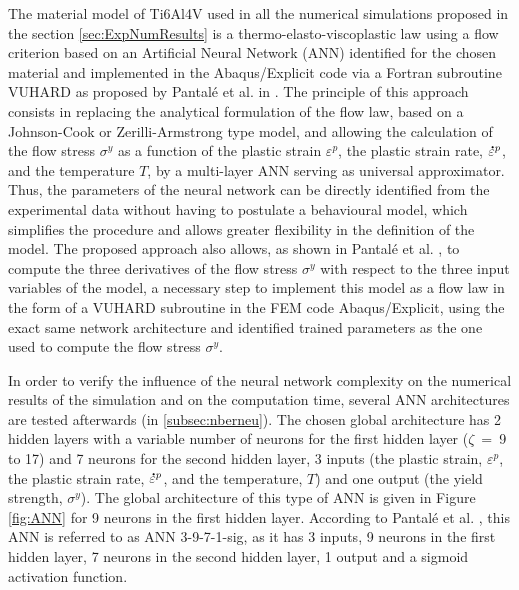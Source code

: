 \documentclass[preprint,12pt,times]{elsarticle}
\newcommand{\mdot}[1]{\accentset{\mbox{\bfseries .}}{#1}} %
\begin{document}
The material model of Ti6Al4V used in all the numerical simulations proposed in the section \ref{sec:ExpNumResults} is a thermo-elasto-viscoplastic law using a flow criterion based on an Artificial Neural Network (ANN) identified for the chosen material and implemented in the Abaqus/Explicit code via a Fortran subroutine VUHARD as proposed by Pantalé et al. in \cite{pantale_Efficient_2022}.
The principle of this approach consists in replacing the analytical formulation of the flow law, based on a Johnson-Cook or Zerilli-Armstrong type model, and allowing the calculation of the flow stress $\sigma^y$ as a function of the plastic strain $\varepsilon^p$, the plastic strain rate, $\mdot{\varepsilon}^p$, and the temperature $T$, by a multi-layer ANN serving as universal approximator. Thus, the parameters of the neural network can be directly identified from the experimental data without having to postulate a behavioural model, which simplifies the procedure and allows greater flexibility in the definition of the model.
The proposed approach also allows, as shown in Pantalé et al. \cite{pantale_Efficient_2022}, to compute the three derivatives of the flow stress $\sigma^y$ with respect to the three input variables of the model, a necessary step to implement this model as a flow law in the form of a VUHARD subroutine in the FEM code Abaqus/Explicit, using the exact same network architecture and identified trained parameters as the one used to compute the flow stress $\sigma^y$.

In order to verify the influence of the neural network complexity on the numerical results of the simulation and on the computation time, several ANN architectures are tested afterwards (in \ref{subsec:nberneu}). The chosen global architecture has 2 hidden layers with a variable number of neurons for the first hidden layer ($\zeta$~=~9 to 17) and 7 neurons for the second hidden layer, 3 inputs (the plastic strain, $\varepsilon^p$, the plastic strain rate, $\mdot{\varepsilon}^p$, and the temperature, $T$) and one output (the yield strength, $\sigma^y$). The global architecture of this type of ANN is given in Figure \ref{fig:ANN} for 9 neurons in the first hidden layer. According to Pantalé et al. \cite{pantale_Efficient_2022}, this ANN is referred to as ANN 3-9-7-1-sig, as it has 3 inputs, 9 neurons in the first hidden layer, 7 neurons in the second hidden layer, 1 output and a sigmoid activation function.
\end{document}
